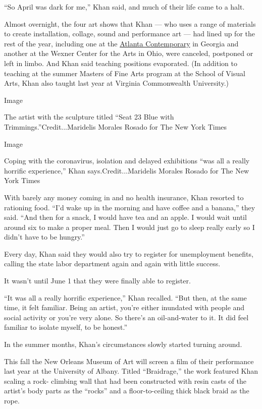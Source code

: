 ``So April was dark for me,'' Khan said, and much of their life came to
a halt.

Almost overnight, the four art shows that Khan --- who uses a range of
materials to create installation, collage, sound and performance art ---
had lined up for the rest of the year, including one at the
\href{https://atlantacontemporary.org/press/atlanta-contemporary-announces-decade-by-baseera-khan}{Atlanta
Contemporary} in Georgia and another at the Wexner Center for the Arts
in Ohio, were canceled, postponed or left in limbo. And Khan said
teaching positions evaporated. (In addition to teaching at the summer
Masters of Fine Arts program at the School of Visual Arts, Khan also
taught last year at Virginia Commonwealth University.)

Image

The artist with the sculpture titled ``Seat 23 Blue with
Trimmings.''Credit...Maridelis Morales Rosado for The New York Times

Image

Coping with the coronavirus, isolation and delayed exhibitions ``was all
a really horrific experience,'' Khan says.Credit...Maridelis Morales
Rosado for The New York Times

With barely any money coming in and no health insurance, Khan resorted
to rationing food. ``I'd wake up in the morning and have coffee and a
banana,'' they said. ``And then for a snack, I would have tea and an
apple. I would wait until around six to make a proper meal. Then I would
just go to sleep really early so I didn't have to be hungry.''

Every day, Khan said they would also try to register for unemployment
benefits, calling the state labor department again and again with little
success.

It wasn't until June 1 that they were finally able to register.

``It was all a really horrific experience,'' Khan recalled. ``But then,
at the same time, it felt familiar. Being an artist, you're either
inundated with people and social activity or you're very alone. So
there's an oil-and-water to it. It did feel familiar to isolate myself,
to be honest.''

In the summer months, Khan's circumstances slowly started turning
around.

This fall the New Orleans Museum of Art will screen a film of their
performance last year at the University of Albany. Titled ``Braidrage,''
the work featured Khan scaling a rock- climbing wall that had been
constructed with resin casts of the artist's body parts as the ``rocks''
and a floor-to-ceiling thick black braid as the rope.

